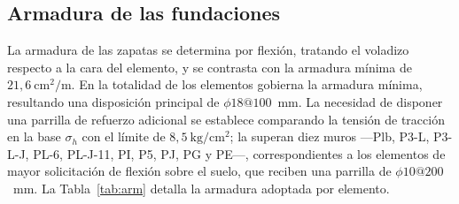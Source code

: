 \subsection{Armadura de las fundaciones}
La armadura de las zapatas se determina por flexión, tratando el voladizo respecto a la cara del elemento, y se contrasta con la armadura mínima de $21,6~\mathrm{cm^2/m}$. En la totalidad de los elementos gobierna la armadura mínima, resultando una disposición principal de $\phi 18 @ 100$~mm. La necesidad de disponer una parrilla de refuerzo adicional se establece comparando la tensión de tracción en la base $\sigma_h$ con el límite de $8,5~\mathrm{kg/cm^2}$; la superan diez muros —Plb, P3-L, P3-L-J, PL-6, PL-J-11, PI, P5, PJ, PG y PE—, correspondientes a los elementos de mayor solicitación de flexión sobre el suelo, que reciben una parrilla de $\phi 10 @ 200$~mm. La Tabla~\ref{tab:arm} detalla la armadura adoptada por elemento.

